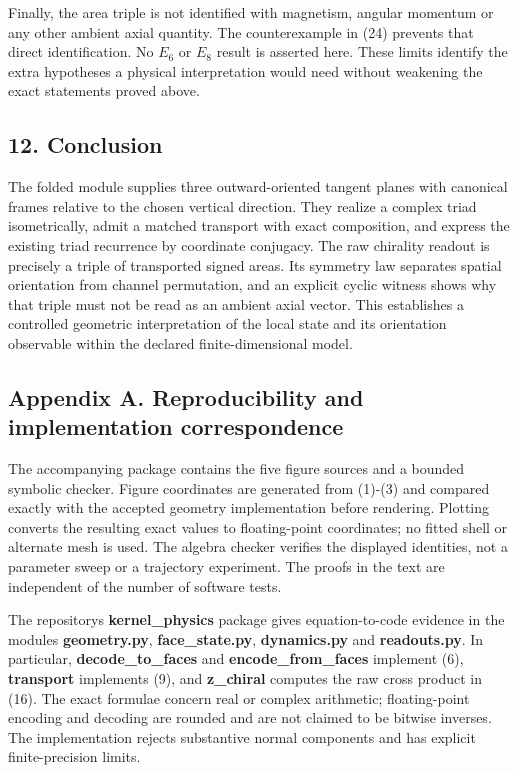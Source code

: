 \documentclass[
  11pt,
  a4paper,
]{article}
\begin{document}
Finally, the area triple is not identified with magnetism, angular momentum or any other ambient axial quantity. The counterexample in (24) prevents that direct identification. No \(E_6\) or \(E_8\) result is asserted here. These limits identify the extra hypotheses a physical interpretation would need without weakening the exact statements proved above.

\subsection{12. Conclusion}\label{conclusion}

The folded module supplies three outward-oriented tangent planes with canonical frames relative to the chosen vertical direction. They realize a complex triad isometrically, admit a matched transport with exact composition, and express the existing triad recurrence by coordinate conjugacy. The raw chirality readout is precisely a triple of transported signed areas. Its symmetry law separates spatial orientation from channel permutation, and an explicit cyclic witness shows why that triple must not be read as an ambient axial vector. This establishes a controlled geometric interpretation of the local state and its orientation observable within the declared finite-dimensional model.

\subsection{Appendix A. Reproducibility and implementation correspondence}\label{appendix-a.-reproducibility-and-implementation-correspondence}

The accompanying package contains the five figure sources and a bounded symbolic checker. Figure coordinates are generated from (1)-(3) and compared exactly with the accepted geometry implementation before rendering. Plotting converts the resulting exact values to floating-point coordinates; no fitted shell or alternate mesh is used. The algebra checker verifies the displayed identities, not a parameter sweep or a trajectory experiment. The proofs in the text are independent of the number of software tests.

The repository\textquotesingle s \textbf{kernel\_physics} package gives equation-to-code evidence in the modules \textbf{geometry.py}, \textbf{face\_state.py}, \textbf{dynamics.py} and \textbf{readouts.py}. In particular, \textbf{decode\_to\_faces} and \textbf{encode\_from\_faces} implement (6), \textbf{transport} implements (9), and \textbf{z\_chiral} computes the raw cross product in (16). The exact formulae concern real or complex arithmetic; floating-point encoding and decoding are rounded and are not claimed to be bitwise inverses. The implementation rejects substantive normal components and has explicit finite-precision limits.
\end{document}
